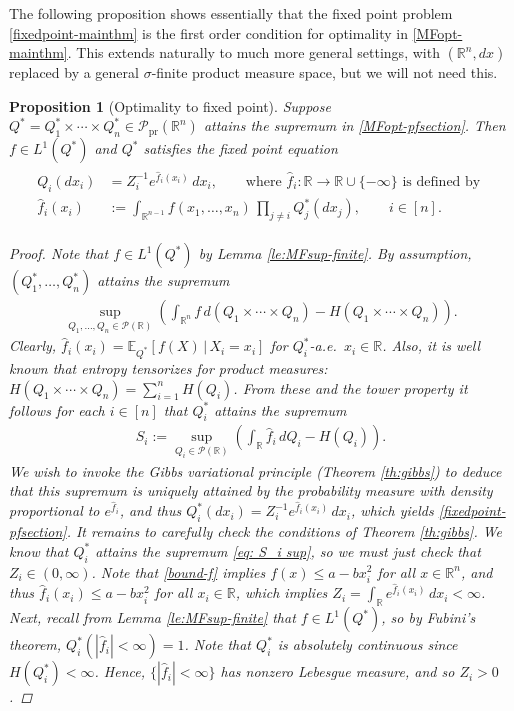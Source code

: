 \documentclass[11pt,reqno]{amsart}
\numberwithin{equation}{section}
\newtheorem{proposition}[theorem]{Proposition}
\theoremstyle{definition}
\def\E{{\mathbb E}}
\def\R{{\mathbb R}}
\def\P{{\mathcal P}}
\def\Pprod{\P_{\mathrm{pr}}}
\begin{document}
The following proposition shows essentially that the fixed point problem \eqref{fixedpoint-mainthm} is the first order condition for optimality in \eqref{MFopt-mainthm}. This extends naturally to much more general settings, with $(\R^n,dx)$ replaced by a general $\sigma$-finite product measure space, but we will not need this.

\begin{proposition}[Optimality to fixed point] \label{pr:optimizer-to-fp}
	Suppose $Q^*=Q^*_1\times\cdots\times Q^*_n \in \Pprod(\R^n)$ attains the supremum in \eqref{MFopt-pfsection}.
	Then $ f \in L^1(Q^*) $ and $Q^*$ satisfies the fixed point equation
		\begin{align}
		\begin{split}
	Q_i(dx_i) &= Z_i^{-1} e^{\hat{f}_i(x_i)}\,dx_i, \qquad  \text{where } \hat{f}_i : \R \to \R \cup \{-\infty\} \text{ is defined by } \\
	\hat{f}_i(x_i) &:=  \int_{\R^{n-1}} f(x_1,\ldots,x_n) \, \prod_{j \neq i} Q^*_j(dx_j), \qquad i\in [n].
	\end{split} \label{fixedpoint-pfsection}
\end{align}
	\begin{proof}
		Note that $f \in L^1(Q^*)$ by Lemma \ref{le:MFsup-finite}.
		By assumption, $(Q^*_1,\ldots,Q^*_n)$ attains the supremum
		\begin{align*}
			\sup_{Q _1,\ldots,Q_n\in \P(\R) } \left( \int_{\R^n} f\,d(Q_1 \times \cdots \times Q_n) - H(Q_1 \times \cdots \times Q_n)\right).
		\end{align*}
		Clearly, $ \hat{f}_i(x_i)  = \E_{Q^*}[f(X)\,|\,X_i=x_i]$ for $ Q^*_i$-a.e.\ $ x_i \in \R $. Also,  it is well known that entropy tensorizes for product measures: $H(Q_1 \times \cdots \times Q_n) = \sum_{i=1}^nH(Q_i)$.
		From these and the tower property	it follows for each $i \in [n]$ that $Q^*_i$ attains the supremum
		\begin{align}
			S_i := \sup_{Q_i \in \P(\R) } \left( \int_{\R} \hat{f}_i\,dQ_i - H(Q_i)\right). \label{eq: S_i sup}
		\end{align}
We wish to invoke the Gibbs variational principle (Theorem \ref{th:gibbs}) to deduce that this supremum is uniquely attained by the probability measure with density proportional to $e^{\hat{f}_i}$, and thus $Q^*_i(dx_i) = Z_i^{-1}e^{\hat{f}_i(x_i)}\,dx_i$, which yields \eqref{fixedpoint-pfsection}.
It remains to carefully check the conditions of Theorem \ref{th:gibbs}.
We know that $Q^*_i$ attains the supremum \eqref{eq: S_i sup}, so we must just check that $Z_i \in (0,\infty)$.
Note that \eqref{bound-f} implies $f(x) \le a - b x_i^2$ for all $x \in \R^n$, and thus $\hat{f}_i(x_i) \le a - b x_i^2$ for all $x_i \in \R$,
which implies $ Z_i  = \int_\R e^{\hat{f}_i(x_i)} \, dx_i < \infty$. Next, recall from Lemma \ref{le:MFsup-finite} that $ f \in L^1(Q^*) $, so by Fubini's theorem, $Q_i^*(|\hat{f}_i| <\infty)=1$. Note that $Q^*_i$ is absolutely continuous since $H(Q_i^*) <\infty$. Hence, $\{|\hat{f}_i| < \infty\}$ has nonzero Lebesgue measure, and so $Z_i > 0$. 	

\end{proof}
\end{proposition}
\end{document}
